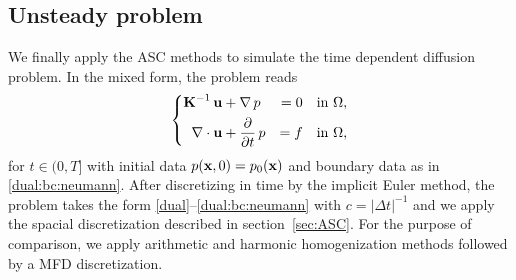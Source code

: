  	\subsection{Unsteady problem}

	We finally apply the ASC methods to simulate the time dependent diffusion problem.  In the mixed form, the problem reads
	\begin{equation}\label{dual_transient}
		\left\{\begin{split}
			\boldsymbol{\mathbf{K}}^{-1}\,\boldsymbol{\mathbf{u}} &+ \nabla\,p\,&= 0&\quad\text{in } \Omega , \\
			\nabla\cdot\boldsymbol{\mathbf{u}}    &+ \frac{\partial}{\partial t}\,p       &= f&\quad\text{in } \Omega,
		\end{split}\right.
\end{equation}
for   $t\in(0, T]$ with initial data $p(\boldsymbol{\mathbf{x}}, 0) = p_0(\boldsymbol{\mathbf{x}})$ and
boundary data as in \eqref{dual:bc:neumann}. After discretizing in time by the implicit Euler method, the problem takes the form \eqref{dual}--\eqref{dual:bc:neumann} with $c=|\Delta t|^{-1}$ and we apply the spacial discretization described in section~\ref{sec:ASC}. For the purpose of comparison, we apply   arithmetic and harmonic homogenization methods followed by a MFD discretization.  




